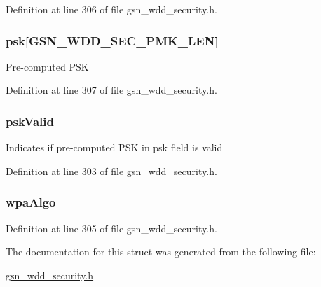 Definition at line 306 of file gsn\_\-wdd\_\-security.h.

\hypertarget{a00294_ad208e97270b561511a07b99d36718945}{
\subsubsection[{psk}]{ {\bf psk}\mbox{[}GSN\_\-WDD\_\-SEC\_\-PMK\_\-LEN\mbox{]}}}
\label{a00294_ad208e97270b561511a07b99d36718945}
Pre-\/computed PSK 

Definition at line 307 of file gsn\_\-wdd\_\-security.h.

\hypertarget{a00294_ab199f55484c9f551020b3597b0c425d9}{
\subsubsection[{pskValid}]{ {\bf pskValid}}}
\label{a00294_ab199f55484c9f551020b3597b0c425d9}
Indicates if pre-\/computed PSK in psk field is valid 

Definition at line 303 of file gsn\_\-wdd\_\-security.h.

\hypertarget{a00294_a8e715bc8b16734e3b5fdd9a48babf510}{
\subsubsection[{wpaAlgo}]{ {\bf wpaAlgo}}}
\label{a00294_a8e715bc8b16734e3b5fdd9a48babf510}


Definition at line 305 of file gsn\_\-wdd\_\-security.h.



The documentation for this struct was generated from the following file:\begin{DoxyCompactItemize}
\item 
\hyperlink{a00604}{gsn\_\-wdd\_\-security.h}\end{DoxyCompactItemize}
